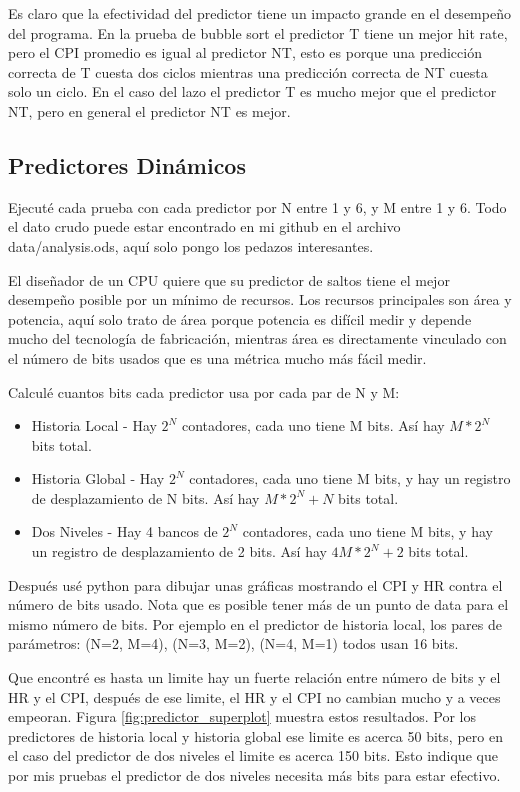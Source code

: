 \documentclass[a4paper]{article}
\begin{document}
Es claro que la efectividad del predictor tiene un impacto grande en el desempeño del programa. En la prueba de bubble sort el predictor T tiene un mejor hit rate, pero el CPI promedio es igual al predictor NT, esto es porque una predicción correcta de T cuesta dos ciclos mientras una predicción correcta de NT cuesta solo un ciclo. En el caso del lazo el predictor T es mucho mejor que el predictor NT, pero en general el predictor NT es mejor.

\subsection{Predictores Dinámicos}

Ejecuté cada prueba con cada predictor por N entre 1 y 6, y M entre 1 y 6. Todo el dato crudo puede estar encontrado en mi github en el archivo data/analysis.ods, aquí solo pongo los pedazos interesantes.

El diseñador de un CPU quiere que su predictor de saltos tiene el mejor desempeño posible por un mínimo de recursos. Los recursos principales son área y potencia, aquí solo trato de área porque potencia es difícil medir y depende mucho del tecnología de fabricación, mientras área es directamente vinculado con el número de bits usados que es una métrica mucho más fácil medir.

Calculé cuantos bits cada predictor usa por cada par de N y M:

\begin{itemize}
    \item Historia Local - Hay $2^N$ contadores, cada uno tiene M bits. Así hay $ M * 2^N $ bits total.
    \item Historia Global - Hay $2^N$ contadores, cada uno tiene M bits, y hay un registro de desplazamiento de N bits. Así hay $ M * 2^N + N $ bits total.
    \item Dos Niveles - Hay 4 bancos de $2^N$ contadores, cada uno tiene M bits, y hay un registro de desplazamiento de 2 bits. Así hay $ 4M * 2^N + 2 $ bits total.
\end{itemize}

Después usé python para dibujar unas gráficas mostrando el CPI y HR contra el número de bits usado. Nota que es posible tener más de un punto de data para el mismo número de bits. Por ejemplo en el predictor de historia local, los pares de parámetros: (N=2, M=4), (N=3, M=2), (N=4, M=1) todos usan 16 bits.

Que encontré es hasta un limite hay un fuerte relación entre número de bits y el HR y el CPI, después de ese limite, el HR y el CPI no cambian mucho y a veces empeoran. Figura \ref{fig:predictor_superplot} muestra estos resultados. Por los predictores de historia local y historia global ese limite es acerca 50 bits, pero en el caso del predictor de dos niveles el limite es acerca 150 bits. Esto indique que por mis pruebas el predictor de dos niveles necesita más bits para estar efectivo.
\end{document}
